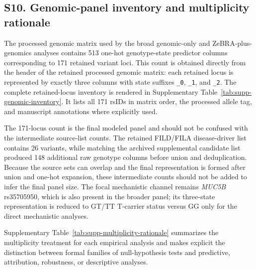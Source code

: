 \subsection*{S10. Genomic-panel inventory and multiplicity rationale}

The processed genomic matrix used by the broad genomic-only and ZeBRA-plus-genomics analyses contains 513 one-hot genotype-state predictor columns corresponding to 171 retained variant loci. This count is obtained directly from the header of the retained processed genomic matrix: each retained locus is represented by exactly three columns with state suffixes \texttt{\_0}, \texttt{\_1}, and \texttt{\_2}. The complete retained-locus inventory is rendered in Supplementary Table~\ref{tab:supp-genomic-inventory}. It lists all 171 rsIDs in matrix order, the processed allele tag, and manuscript annotations where explicitly used.

The 171-locus count is the final modeled panel and should not be confused with the intermediate source-list counts. The retained FILD/FILA disease-driver list contains 26 variants, while matching the archived supplemental candidate list produced 148 additional raw genotype columns before union and deduplication. Because the source sets can overlap and the final representation is formed after union and one-hot expansion, these intermediate counts should not be added to infer the final panel size. The focal mechanistic channel remains \textit{MUC5B} rs35705950, which is also present in the broader panel; its three-state representation is reduced to GT/TT T-carrier status versus GG only for the direct mechanistic analyses.

Supplementary Table~\ref{tab:supp-multiplicity-rationale} summarizes the multiplicity treatment for each empirical analysis and makes explicit the distinction between formal families of null-hypothesis tests and predictive, attribution, robustness, or descriptive analyses.

